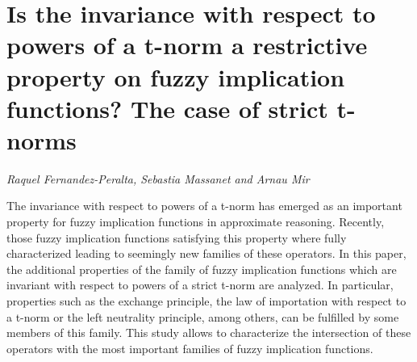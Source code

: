 \documentclass[../booklet.tex]{subfiles}
\begin{document}
\section[Is the invariance with respect to powers of a t-norm a restrictive property on fuzzy implication functions? The case of strict t-norms. {\it Raquel Fernandez-Peralta, Sebastia Massanet and Arnau Mir}]{Is the invariance with respect to powers of a t-norm a restrictive property on fuzzy implication functions? The case of strict t-norms}
  

\begin{center}
  {\it Raquel Fernandez-Peralta, Sebastia Massanet and Arnau Mir}
\end{center}

\vskip 0.8cm


The invariance with respect to powers of a t-norm has emerged as an important property for fuzzy implication functions in approximate reasoning. Recently, those fuzzy implication functions satisfying this property where fully characterized leading to seemingly new families of these operators. In this paper, the additional properties of the family of fuzzy implication functions which are invariant with respect to powers of a strict t-norm are analyzed. In particular, properties such as the exchange principle, the law of importation with respect to a t-norm or the left neutrality principle, among others, can be fulfilled by some members of this family. This study allows to characterize the intersection of these operators with the most important families of fuzzy implication functions.  

\end{document}

